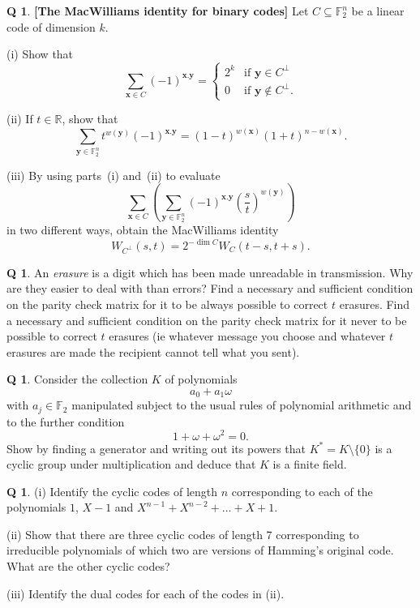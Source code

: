 \documentclass[12pt,a4paper]{article}
\theoremstyle{plain}
\theoremstyle{definition}
\newtheorem{question}[theorem]{Q}
\begin{document}
\begin{question}{\bf[The MacWilliams identity for binary codes]}%
\label{E;MacWilliams}\label{C3.9}
Let $C\subseteq {\mathbb F}_{2}^{n}$ be a linear code
of dimension $k$.
 
(i) Show that
\[\sum_{{\mathbf x}\in C}(-1)^{{\mathbf x}.{\mathbf y}}
=\begin{cases}
2^{k}&\text{if ${\mathbf y}\in C^{\perp}$}\\
0&\text{if ${\mathbf y}\notin C^{\perp}$}.
\end{cases}\]

(ii) If $t\in{\mathbb R}$, show that
\[\sum_{{\mathbf y}\in {\mathbb F}_{2}^{n}}t^{w({\mathbf y})}
(-1)^{{\mathbf x}.{\mathbf y}}
=(1-t)^{w({\mathbf x})}(1+t)^{n-w({\mathbf x})}.\]

(iii) By using parts~(i) and~(ii) to evaluate
\[\sum_{{\mathbf x}\in C}
\left(\sum_{{\mathbf y}\in {\mathbb F}_{2}^{n}}
(-1)^{{\mathbf x}.{\mathbf y}}\left(\frac{s}{t}\right)^{w({\mathbf y})}
\right)\]
in two different ways, obtain the MacWilliams identity
\[W_{C^{\perp}}(s,t)=2^{-\dim C}W_{C}(t-s,t+s).\]
\end{question} 
\begin{question}\label{C3.10}
An \emph{erasure} is a digit which has
been made unreadable in transmission. Why are they
easier to deal with than errors? Find a necessary
and sufficient condition on the parity check matrix
for it to be always possible to correct
$t$ erasures.  Find a necessary
and sufficient condition on the parity check matrix
for it never to be possible to correct
$t$ erasures (ie whatever message you choose
and whatever $t$ erasures are made the recipient
cannot tell what you sent).
\end{question}
\begin{question}\label{C3.11}
Consider the collection $K$ of polynomials
\[a_{0}+a_{1}\omega\]
with $a_{j}\in{\mathbb F}_{2}$ manipulated
subject to the usual rules of polynomial
arithmetic and to the further condition
\[1+\omega+\omega^{2}=0.\]
Show by finding a generator and writing out its powers
that
$K^{*}=K\setminus\{0\}$ is a cyclic group
under multiplication and deduce that
$K$ is a finite field.

\end{question}
\begin{question}\label{C3.12}\label{E;Hamming original}
(i) Identify the cyclic codes of
length $n$ corresponding to each of the polynomials
$1$, $X-1$  and $X^{n-1}+X^{n-2}+\dots+X+1$.

(ii) Show that there are three cyclic codes
of length 7 corresponding to irreducible
polynomials of which two are versions of Hamming's
original code. What are the other cyclic codes?

(iii) Identify the dual codes for each of the
codes in (ii).
\end{question}
\end{document}
